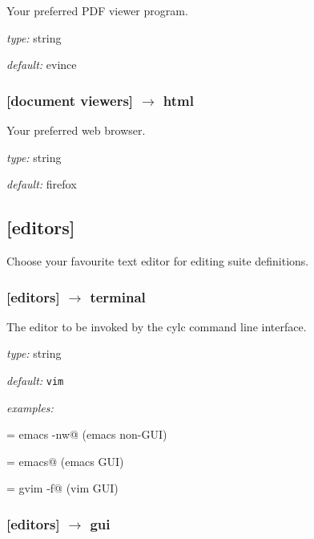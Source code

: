 Your preferred PDF viewer program.

\begin{myitemize}
\item {\em type:} string
\item {\em default:} evince
\end{myitemize}

\subsubsection[html]{[document viewers] $\rightarrow$ html}

Your preferred web browser.

\begin{myitemize}
\item {\em type:} string
\item {\em default:} firefox
\end{myitemize}

\subsection{[editors]}

Choose your favourite text editor for editing suite definitions.

\subsubsection[terminal]{[editors] $\rightarrow$ terminal}

The editor to be invoked by the cylc command line interface.

\begin{myitemize}
\item {\em type:} string
\item {\em default:} \lstinline=vim=
\item {\em examples:}
    \begin{myitemize}
            \item \lstinline@terminal = emacs -nw@ (emacs non-GUI)
            \item \lstinline@terminal = emacs@ (emacs GUI)
            \item \lstinline@terminal = gvim -f@ (vim GUI)
    \end{myitemize}
\end{myitemize}

\subsubsection[gui]{[editors] $\rightarrow$ gui}

